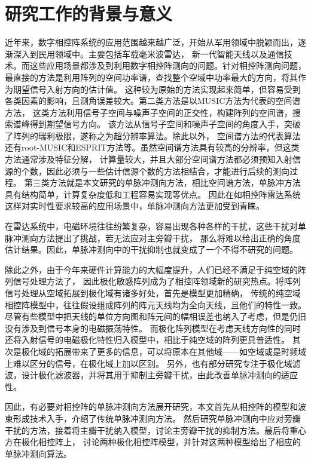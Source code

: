 \documentclass[master]{thesis-uestc}
\begin{document}
\thesischapterexordium

\section{研究工作的背景与意义}
近年来，数字相控阵系统的应用范围越来越广泛，开始从军用领域中脱颖而出，逐渐深入到民用领域中。主要包括车载毫米波雷达，
新一代智能天线以及通信技术。而这些应用场景都涉及到利用数字相控阵测向的问题。针对相控阵测向问题，
最直接的方法是利用阵列的空间功率谱，查找整个空域中功率最大的方向，将其作为期望信号入射方向的估计值。
这种较为原始的方法实现起来简单，但容易受到各类因素的影响，且测角误差较大。第二类方法是以MUSIC方法为代表的空间谱方法，
这类方法利用信号子空间与噪声子空间的正交性，构建阵列的空间谱，搜索谱峰得到期望信号方向。
该方法从信号子空间和噪声子空间的角度入手，突破了阵列的瑞利极限，遂称之为超分辨率算法。除此以外，
空间谱方法的代表算法还有root-MUSIC和ESPRIT方法等。虽然空间谱方法具有较高的分辨率，但这类方法通常涉及特征分解，
计算量较大，并且大部分空间谱方法都必须预知入射信源的个数，因此必须与一些估计信源个数的方法相结合，才能进行后续的测向过程。
第三类方法就是本文研究的单脉冲测向方法，相比空间谱方法，单脉冲方法具有结构简单，计算复杂度低和工程容易实现等优点。
因此在如相控阵雷达系统这样对实时性要求较高的应用场景中，单脉冲测向方法更加受到青睐。

在雷达系统中，电磁环境往往纷繁复杂，容易出现各种各样的干扰，这些干扰对单脉冲测向方法提出了挑战，若无法应对主旁瓣干扰，
那么将难以给出正确的角度估计结果。因此，单脉冲测向中的干扰抑制也就变成了一个不得不研究的问题。

除此之外，由于今年来硬件计算能力的大幅度提升，人们已经不满足于纯空域的阵列信号处理方法了，
因此极化敏感阵列成为了相控阵领域新的研究热点。将阵列信号处理从空域拓展到极化域有诸多好处，首先是模型更加精确，
传统的纯空域相控阵模型中，往往假设组成阵列的阵元天线均为全向天线，且他们的特性一致。
尽管有些模型中把天线的单位方向图和阵元间的幅相误差也纳入了考虑，但是仍旧没有涉及到信号本身的电磁振荡特性。
而极化阵列模型在考虑天线方向性的同时还将入射信号的电磁极化特性归入模型中，相比于纯空域的阵列更具普适性。
其次是极化域的拓展带来了更多的信息，可以将原本在其他域——如空域或是时频域上难以区分的信号，在极化域上加以区别。
另外，也有部分研究专注于极化域滤波，设计极化滤波器，并将其用于抑制主旁瓣干扰，由此改善单脉冲测向的适应性。

因此，有必要对相控阵的单脉冲测向方法展开研究，本文首先从相控阵的模型和波束形成技术入手，介绍了传统单脉冲测向方法。
然后研究单脉冲测向中应对旁瓣干扰的方法，接着将主瓣干扰纳入模型，讨论主旁瓣干扰的抑制方法。最后将重心方在极化相控阵上，
讨论两种极化相控阵模型，并针对这两种模型给出了相应的单脉冲测向算法。
\end{document}
